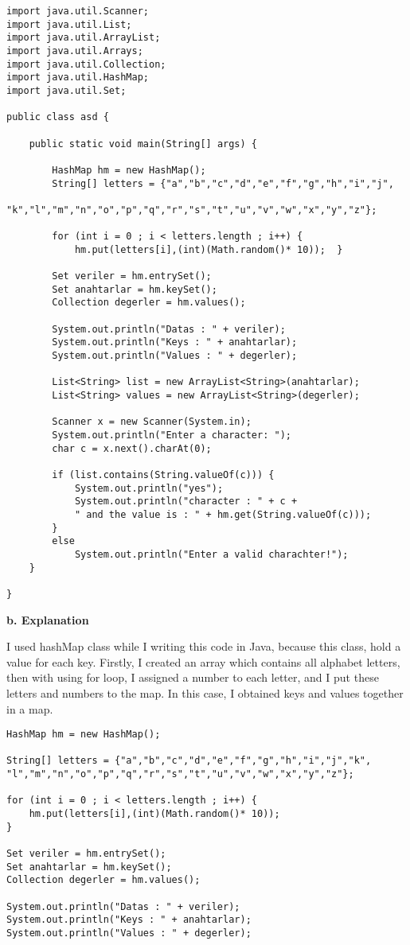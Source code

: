 \documentclass{report}
\begin{document}
\begin{small}
\begin{lstlisting}
import java.util.Scanner;
import java.util.List;
import java.util.ArrayList;
import java.util.Arrays;
import java.util.Collection;
import java.util.HashMap;
import java.util.Set;

public class asd {

	public static void main(String[] args) {
				
		HashMap hm = new HashMap();		
		String[] letters = {"a","b","c","d","e","f","g","h","i","j",
		"k","l","m","n","o","p","q","r","s","t","u","v","w","x","y","z"};
		
		for (int i = 0 ; i < letters.length ; i++) {
			hm.put(letters[i],(int)(Math.random()* 10));  }

		Set veriler = hm.entrySet();
		Set anahtarlar = hm.keySet();
		Collection degerler = hm.values();

		System.out.println("Datas : " + veriler);
		System.out.println("Keys : " + anahtarlar);
		System.out.println("Values : " + degerler);
		
		List<String> list = new ArrayList<String>(anahtarlar);
		List<String> values = new ArrayList<String>(degerler);

		Scanner x = new Scanner(System.in);
		System.out.println("Enter a character: ");
		char c = x.next().charAt(0);
		
		if (list.contains(String.valueOf(c))) {
			System.out.println("yes");
			System.out.println("character : " + c +
			" and the value is : " + hm.get(String.valueOf(c)));
		}
		else
			System.out.println("Enter a valid charachter!");
	}

}
\end{lstlisting}
\end{small}


{\large \textbf{b. Explanation}}
\newline
\newline
\begin{flushleft}
I used hashMap class while I writing this code in Java, because this class, hold a value for each key. Firstly, I created an array which contains all alphabet letters, then with using for loop, I assigned a number to each letter, and I put these letters and numbers to the map. In this case, I obtained keys and values together in a map.

\end{flushleft}

\begin{lstlisting}
HashMap hm = new HashMap();
		
String[] letters = {"a","b","c","d","e","f","g","h","i","j","k",
"l","m","n","o","p","q","r","s","t","u","v","w","x","y","z"};
		
for (int i = 0 ; i < letters.length ; i++) {
	hm.put(letters[i],(int)(Math.random()* 10));
}

Set veriler = hm.entrySet();
Set anahtarlar = hm.keySet();
Collection degerler = hm.values();

System.out.println("Datas : " + veriler);
System.out.println("Keys : " + anahtarlar);
System.out.println("Values : " + degerler);
\end{lstlisting}
\end{document}
